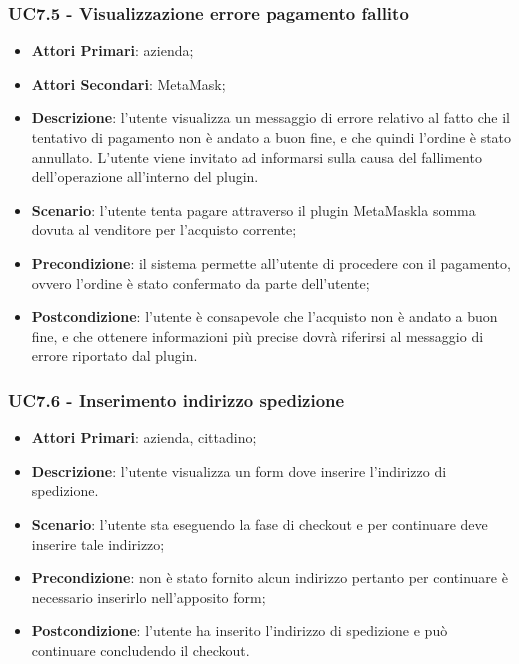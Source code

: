 \subsubsection{UC7.5 - Visualizzazione errore pagamento fallito}
\begin{itemize}
	\item \textbf{Attori Primari}: azienda;
	\item \textbf{Attori Secondari}: MetaMask\glo;
	\item \textbf{Descrizione}:
	l'utente visualizza un messaggio di errore relativo al fatto che il tentativo di pagamento non è andato a buon fine, e che quindi l'ordine è stato annullato. L'utente viene invitato ad informarsi sulla causa del fallimento dell'operazione all'interno del plugin.
	\item \textbf{Scenario}: l'utente tenta pagare attraverso il plugin MetaMask\glosp la somma dovuta al venditore per l'acquisto corrente;
	\item \textbf{Precondizione}: il sistema permette all'utente di procedere con il pagamento, ovvero l'ordine è stato confermato da parte dell'utente;
	\item \textbf{Postcondizione}:
	l'utente è consapevole che l'acquisto non è andato a buon fine, e che ottenere informazioni più precise dovrà riferirsi al messaggio di errore riportato dal plugin. 
\end{itemize}

\subsubsection{UC7.6 - Inserimento indirizzo spedizione}
\begin{itemize}
	\item \textbf{Attori Primari}: azienda, cittadino;
	\item \textbf{Descrizione}:
	l'utente visualizza un form dove inserire l'indirizzo di spedizione.
	\item \textbf{Scenario}: l'utente sta eseguendo la fase di checkout e per continuare deve inserire tale indirizzo;
	\item \textbf{Precondizione}: non è stato fornito alcun indirizzo pertanto per continuare è necessario inserirlo nell'apposito form;
	\item \textbf{Postcondizione}:
	l'utente ha inserito l'indirizzo di spedizione e può continuare concludendo il checkout. 
\end{itemize}